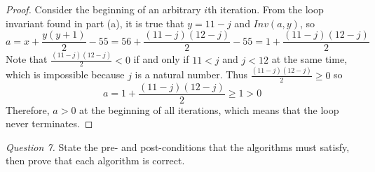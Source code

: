 \documentclass[11pt]{article}
\begin{document}
\begin{enumerate}
\begin{proof}
            Consider the beginning of an arbitrary \(i\)th iteration. From the loop invariant found in part (a), it is true that \(y = 11 - j\) and \(Inv(a,y)\), so
            \[
                a = x + \frac{y(y+1)}{2} - 55 = 56 + \frac{(11-j)(12-j)}{2} - 55 = 1 + \frac{(11-j)(12-j)}{2}
            \]
            Note that \(\frac{(11-j)(12-j)}{2} < 0\) if and only if \(11 < j\) and \(j < 12\) at the same time, which is impossible because \(j\) is a natural number. Thus \(\frac{(11-j)(12-j)}{2} \geq 0\) so
            \[
                a = 1 + \frac{(11-j)(12-j)}{2} \geq 1 > 0
            \]
            Therefore, \(a >0\) at the beginning of all iterations, which means that the loop never terminates.

        \end{proof}
    \end{enumerate}
    \noindent\textit{Question 7.} State the pre- and post-conditions that the algorithms must satisfy, then prove that each algorithm is correct.
\end{document}
